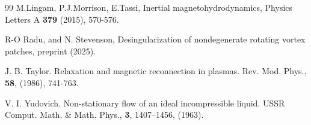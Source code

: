 \documentclass[11pt,reqno]{amsproc}
\begin{document}
\begin{thebibliography}{99}
 M.Lingam, P.J.Morrison, E.Tassi, Inertial magnetohydrodynamics, Physics Letters  A
{\bf{379}} (2015), 570-576.


 R-O Radu, and N. Stevenson, Desingularization of nondegenerate rotating vortex patches, preprint (2025).

J. B. Taylor. Relaxation and magnetic reconnection in plasmas. Rev. Mod. Phys., {\bf 58}, (1986), 741-763.

 V. I. Yudovich. Non-stationary flow of an ideal incompressible liquid. USSR Comput. Math. \& Math. Phys., {\bf 3}, 1407--1456, (1963).

\end{thebibliography}
\end{document}
